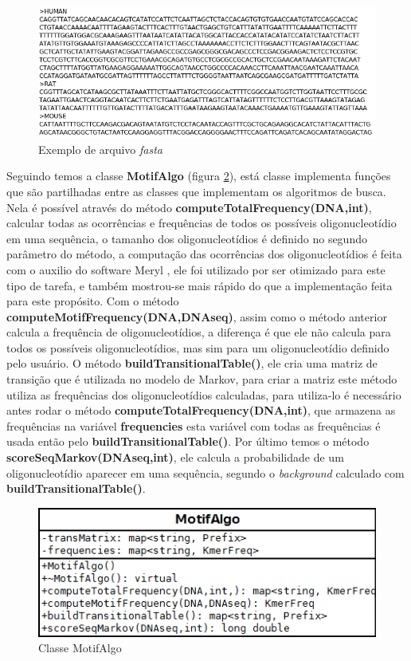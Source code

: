 \begin{figure}[htb!]
    \centering
    \includegraphics[scale=0.7]{./imagens/exe_seq.png}
    \caption{Exemplo de arquivo \textit{fasta}}
    \label{fig:exe_seq}
\end{figure}

Seguindo temos a classe \textbf{MotifAlgo} (figura \ref{fig:MotifAlgo}), está classe implementa funções que são partilhadas entre as classes que implementam os algoritmos de busca. Nela é possível através do método \textbf{computeTotalFrequency(DNA,int)}, calcular todas as ocorrências e frequências de todos os possíveis oligonucleotídio em uma sequência, o tamanho dos oligonucleotídios é definido no segundo parâmetro do método, a computação das ocorrências dos oligonucleotídios é feita com o auxilio do software Meryl \cite{Walenz:2011:Online}, ele foi utilizado por ser otimizado para este tipo de tarefa, e também mostrou-se mais rápido do que a implementação feita para este propósito. Com o método \textbf{computeMotifFrequency(DNA,DNAseq)}, assim como o método anterior calcula a frequência de oligonucleotídios, a diferença é que ele não calcula para todos os possíveis oligonucleotídios, mas sim para um oligonucleotídio definido pelo usuário. O método \textbf{buildTransitionalTable()}, ele cria uma matriz de transição que é utilizada no modelo de Markov, para criar a matriz este método utiliza as frequências dos oligonucleotídios calculadas, para utiliza-lo é necessário antes rodar o método \textbf{computeTotalFrequency(DNA,int)}, que armazena as frequências na variável \textbf{frequencies} esta variável com todas as frequências é usada então pelo \textbf{buildTransitionalTable()}. Por último temos o método \textbf{scoreSeqMarkov(DNAseq,int)}, ele calcula a probabilidade de um oligonucleotídio aparecer em uma sequência, segundo o  \textit{background} calculado com \textbf{buildTransitionalTable()}.

\begin{figure}[htb!]
    \centering
    \includegraphics[scale=0.7]{./imagens/MotifAlgo.png}
    \caption{Classe MotifAlgo}
    \label{fig:MotifAlgo}
\end{figure}

